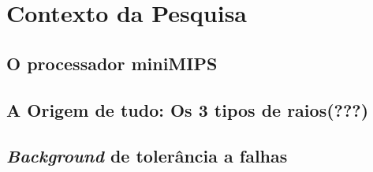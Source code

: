 \chapter{Contexto da Pesquisa}
\section{O processador miniMIPS}
\section{A Origem de tudo: Os 3 tipos de raios(???)}
\section{\textit{Background} de tolerância a falhas}